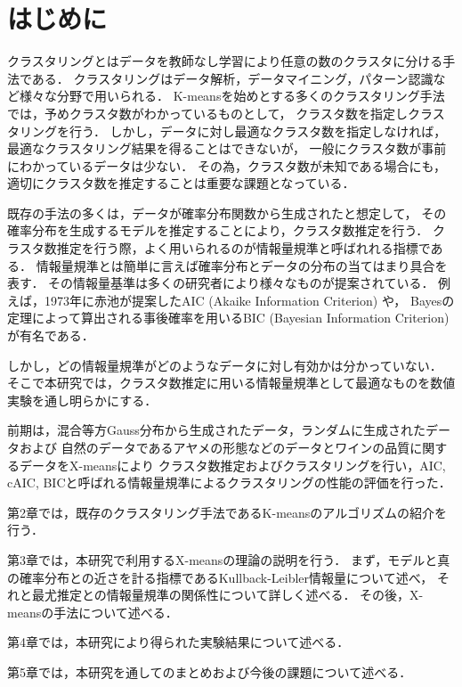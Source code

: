 \section{はじめに}
クラスタリングとはデータを教師なし学習により任意の数のクラスタに分ける手法である．
クラスタリングはデータ解析，データマイニング，パターン認識など様々な分野で用いられる．
K-meansを始めとする多くのクラスタリング手法では，予めクラスタ数がわかっているものとして，
クラスタ数を指定しクラスタリングを行う．
しかし，データに対し最適なクラスタ数を指定しなければ，最適なクラスタリング結果を得ることはできないが，
一般にクラスタ数が事前にわかっているデータは少ない．
その為，クラスタ数が未知である場合にも，適切にクラスタ数を推定することは重要な課題となっている．

既存の手法の多くは，データが確率分布関数から生成されたと想定して，
その確率分布を生成するモデルを推定することにより，クラスタ数推定を行う．
クラスタ数推定を行う際，よく用いられるのが情報量規準と呼ばれれる指標である．
情報量規準とは簡単に言えば確率分布とデータの分布の当てはまり具合を表す．
その情報量基準は多くの研究者により様々なものが提案されている．
例えば，1973年に赤池が提案したAIC (Akaike Information Criterion) や，
Bayesの定理によって算出される事後確率を用いるBIC (Bayesian Information Criterion)が有名である．

しかし，どの情報量規準がどのようなデータに対し有効かは分かっていない．
そこで本研究では，クラスタ数推定に用いる情報量規準として最適なものを数値実験を通し明らかにする．

前期は，混合等方Gauss分布から生成されたデータ，ランダムに生成されたデータおよび
自然のデータであるアヤメの形態などのデータとワインの品質に関するデータをX-meansにより
クラスタ数推定およびクラスタリングを行い，AIC, cAIC, BICと呼ばれる情報量規準によるクラスタリングの性能の評価を行った．

第2章では，既存のクラスタリング手法であるK-meansのアルゴリズムの紹介を行う．

第3章では，本研究で利用するX-meansの理論の説明を行う．
まず，モデルと真の確率分布との近さを計る指標であるKullback-Leibler情報量について述べ，
それと最尤推定との情報量規準の関係性について詳しく述べる．
その後，X-meansの手法について述べる．

第4章では，本研究により得られた実験結果について述べる．

第5章では，本研究を通してのまとめおよび今後の課題について述べる．
